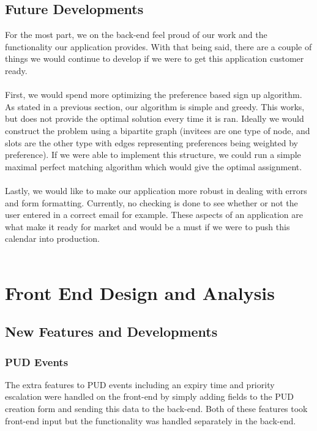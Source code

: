 \documentclass[11pt]{article}   %
\begin{document}
\subsection{Future Developments}
For the most part, we on the back-end feel proud of our work and the functionality our application provides. With that being said, there are a couple of things we would continue to develop if we were to get this application customer ready.\\~\\
First, we would spend more optimizing the preference based sign up algorithm. As stated in a previous section, our algorithm is simple and greedy. This works, but does not provide the optimal solution every time it is ran. Ideally we would construct the problem using a bipartite graph (invitees are one type of node, and slots are the other type with edges representing preferences being weighted by preference). If we were able to implement this structure, we could run a simple maximal perfect matching algorithm which would give the optimal assignment.\\~\\
Lastly, we would like to make our application more robust in dealing with errors and form formatting. Currently, no checking is done to see whether or not the user entered in a correct email for example. These aspects of an application are what make it ready for market and would be a must if we were to push this calendar into production.\\~\\

\section{Front End Design and Analysis}

\subsection{New Features and Developments}

\subsubsection{PUD Events}

The extra features to PUD events including an expiry time and priority escalation were handled on the front-end by simply adding fields to the PUD creation form and sending this data to the back-end. Both of these features  took front-end input but the functionality was handled separately in the back-end.
\end{document}
